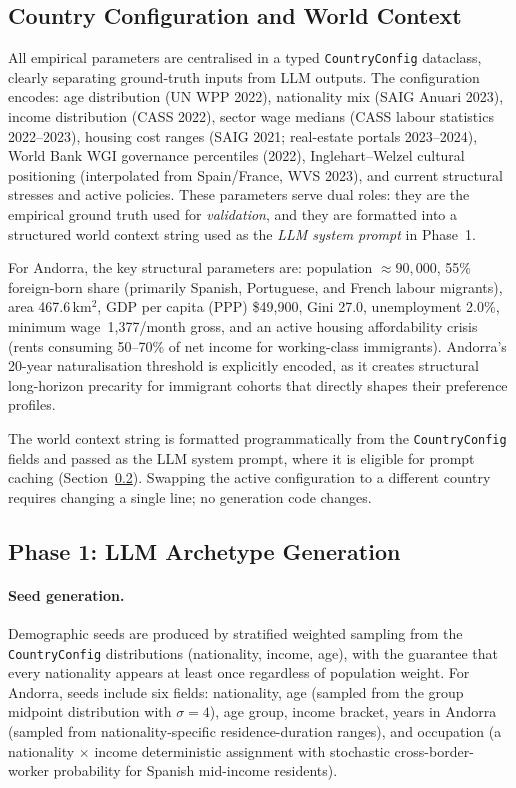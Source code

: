 \documentclass[sustainability,article,submit,pdftex,moreauthors]{Definitions/mdpi}
\begin{document}
\subsection{Country Configuration and World Context}
\label{subsec:world_context}

All empirical parameters are centralised in a typed \texttt{CountryConfig}
dataclass, clearly separating ground-truth inputs from LLM outputs. The
configuration encodes: age distribution (UN WPP 2022), nationality mix
(SAIG Anuari 2023), income distribution (CASS 2022), sector wage medians
(CASS labour statistics 2022--2023), housing cost ranges (SAIG 2021;
real-estate portals 2023--2024), World Bank WGI governance percentiles (2022),
Inglehart--Welzel cultural positioning (interpolated from Spain/France, WVS
2023), and current structural stresses and active policies. These parameters
serve dual roles: they are the empirical ground truth used for
\emph{validation}, and they are formatted into a structured world context
string used as the \emph{LLM system prompt} in Phase~1.

For Andorra, the key structural parameters are: population $\approx 90{,}000$,
55\% foreign-born share (primarily Spanish, Portuguese, and French labour
migrants), area 467.6\,km$^2$, GDP per capita (PPP) \$49{,}900, Gini 27.0,
unemployment 2.0\%, minimum wage \EUR\,1{,}377/month gross, and an
active housing affordability crisis (rents consuming 50--70\% of net income
for working-class immigrants). Andorra's 20-year naturalisation threshold is
explicitly encoded, as it creates structural long-horizon precarity for
immigrant cohorts that directly shapes their preference profiles.

The world context string is formatted programmatically from the
\texttt{CountryConfig} fields and passed as the LLM system prompt, where
it is eligible for prompt caching (Section~\ref{subsec:archetype_generation}).
Swapping the active configuration to a different country requires changing
a single line; no generation code changes.

\subsection{Phase 1: LLM Archetype Generation}
\label{subsec:archetype_generation}

\paragraph{Seed generation.}
Demographic seeds are produced by stratified weighted sampling from the
\texttt{CountryConfig} distributions (nationality, income, age), with the
guarantee that every nationality appears at least once regardless of
population weight. For Andorra, seeds include six fields: nationality,
age (sampled from the group midpoint distribution with $\sigma = 4$), age
group, income bracket, years in Andorra (sampled from nationality-specific
residence-duration ranges), and occupation (a nationality $\times$ income
deterministic assignment with stochastic cross-border-worker probability
for Spanish mid-income residents).
\end{document}
